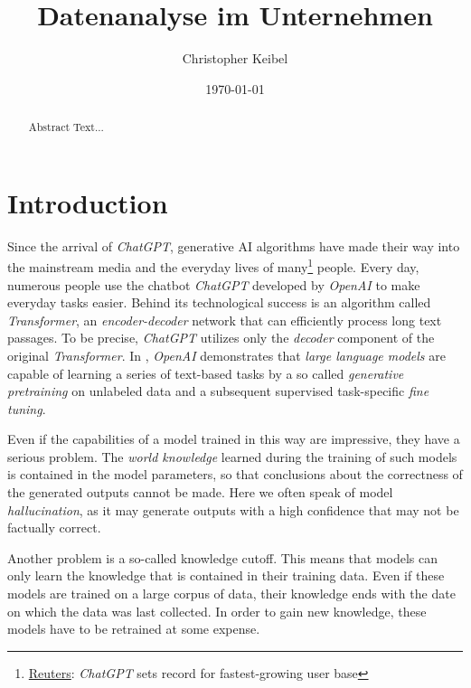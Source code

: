 \documentclass{article}
\title{Datenanalyse im Unternehmen}
\author{Christopher Keibel}
\date{\today}
\begin{document}
\maketitle

\begin{abstract}
    Abstract Text...
\end{abstract}

\section{Introduction}
Since the arrival of \textit{ChatGPT}, generative AI algorithms have made their way into the mainstream media and the everyday lives of many\footnote{\href{https://www.reuters.com/technology/chatgpt-sets-record-fastest-growing-user-base-analyst-note-2023-02-01/}{Reuters}: \textit{ChatGPT} sets record for fastest-growing user base} people. Every day, numerous people use the chatbot \textit{ChatGPT} developed by \textit{OpenAI} to make everyday tasks easier. Behind its technological success is an algorithm called \textit{Transformer}\cite{attentionIsAllYouNeed}, an \textit{encoder-decoder} network that can efficiently process long text passages. To be precise, \textit{ChatGPT} utilizes only the \textit{decoder}\cite{GPT} component of the original \textit{Transformer}.
In \cite{GPT}, \textit{OpenAI} demonstrates that \textit{large language models} are capable of learning a series of text-based tasks by a so called \textit{generative pretraining} on unlabeled data and a subsequent supervised task-specific \textit{fine tuning}.

Even if the capabilities of a model trained in this way are impressive, they have a serious problem. The \textit{world knowledge} learned during the training of such models is contained in the model parameters\cite{RAG}, so that conclusions about the correctness of the generated outputs cannot be made. Here we often speak of model \textit{hallucination}, as it may generate outputs with a high confidence that may not be factually correct.

Another problem is a so-called knowledge cutoff. This means that models can only learn the knowledge that is contained in their training data. Even if these models are trained on a large corpus of data, their knowledge ends with the date on which the data was last collected. In order to gain new knowledge, these models have to be retrained at some expense.
\end{document}
